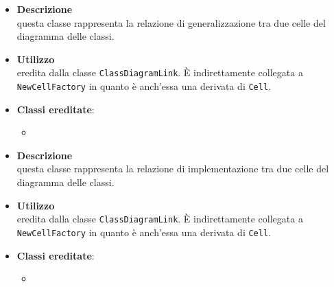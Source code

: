 \label{\nogloxy{swedesigner::client::model::celltypes::class::HxGeneralization}}
\begin{itemize}
\item \textbf{Descrizione}\\
questa classe rappresenta la relazione di generalizzazione tra due celle del diagramma delle classi.
\item \textbf{Utilizzo}\\
eredita dalla classe \texttt{ClassDiagramLink}. È indirettamente collegata a \texttt{NewCellFactory} in quanto è anch'essa una derivata di \texttt{Cell}.
\item \textbf{Classi ereditate}:
\begin{itemize}
\item \hyperref[\nogloxy{swedesigner::client::model::celltypes::class::ClassDiagramLink}]{}
\end{itemize}
\end{itemize}

\label{\nogloxy{swedesigner::client::model::celltypes::class::HxImplementation}}
\begin{itemize}
\item \textbf{Descrizione}\\
questa classe rappresenta la relazione di implementazione tra due celle del diagramma delle classi.
\item \textbf{Utilizzo}\\
eredita dalla classe \texttt{ClassDiagramLink}. È indirettamente collegata a \texttt{NewCellFactory} in quanto è anch'essa una derivata di \texttt{Cell}.
\item \textbf{Classi ereditate}:
\begin{itemize}
\item \hyperref[\nogloxy{swedesigner::client::model::celltypes::class::ClassDiagramLink}]{}
\end{itemize}
\end{itemize}

